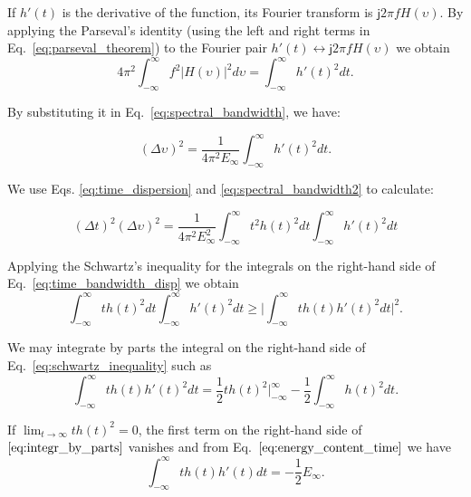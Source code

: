 If $h'(t)$ is the derivative of the function, its Fourier transform is $\mathsf{j}2\pi f H(\upsilon)$. By applying the Parseval's identity (using the left and right terms in Eq.\ \eqref{eq:parseval_theorem}) to the Fourier pair $h'(t)\longleftrightarrow \mathsf{j}2\pi f H(\upsilon)$ we obtain
\begin{equation}\label{eq:applyed_parseval_theorem}
    4 \pi^{2} \int_{-\infty}^{\infty} f^2 |H(\upsilon)|^2 d\upsilon =  \int_{-\infty}^{\infty} h'(t)^2 dt \text{.}
\end{equation}

By substituting it in Eq.\ \eqref{eq:spectral_bandwidth}, we have:

\begin{equation}\label{eq:spectral_bandwidth2}
    (\Delta \upsilon)^2 = \frac{1}{4 \pi^{2} E_{\infty}} \int_{-\infty}^{\infty} h'(t)^2 dt \text{.}
\end{equation}

We use Eqs. \eqref{eq:time_dispersion} and \eqref{eq:spectral_bandwidth2} to calculate:

\begin{equation}\label{eq:time_bandwidth_disp}
    (\Delta t)^2(\Delta \upsilon)^2 = \frac{1}{4 \pi^{2} E_{\infty}^{2}} \int_{-\infty}^{\infty} t^2h(t)^2 dt \int_{-\infty}^{\infty}h'(t)^2 dt
\end{equation}

Applying the Schwartz's inequality for the integrals on the right-hand side of Eq.\ \eqref{eq:time_bandwidth_disp} we obtain
\begin{equation}\label{eq:schwartz_inequality}
    \int_{-\infty}^{\infty}t h(t)^2 dt \int_{-\infty}^{\infty}h'(t)^2 dt  \geq \biggr\rvert \int_{-\infty}^{\infty}t h(t)h'(t)^2 dt \biggr\rvert^{2}\text{.}
\end{equation}

We may integrate by parts the integral on the right-hand side of Eq.\ \eqref{eq:schwartz_inequality} such as
\begin{equation}\label{eq:integr_by_parts}
    \int_{-\infty}^{\infty}t h(t) h'(t)^2 dt =  \frac{1}{2}t h(t)^2 \biggr\rvert_{-\infty}^{\infty} - \frac{1}{2} \int_{-\infty}^{\infty}h(t)^2 dt\text{.}
\end{equation}

If $\lim_{t\rightarrow \infty} t h(t)^2=0$, the first term on the right-hand side of $\eqref{eq:integr_by_parts}$ vanishes and from Eq.\ $\eqref{eq:energy_content_time}$ we have
\begin{equation}\label{eq:energy_content_developped}
    \int_{-\infty}^{\infty} t h(t)h'(t) dt = -\frac{1}{2} E_{\infty} \text{.}
\end{equation}


